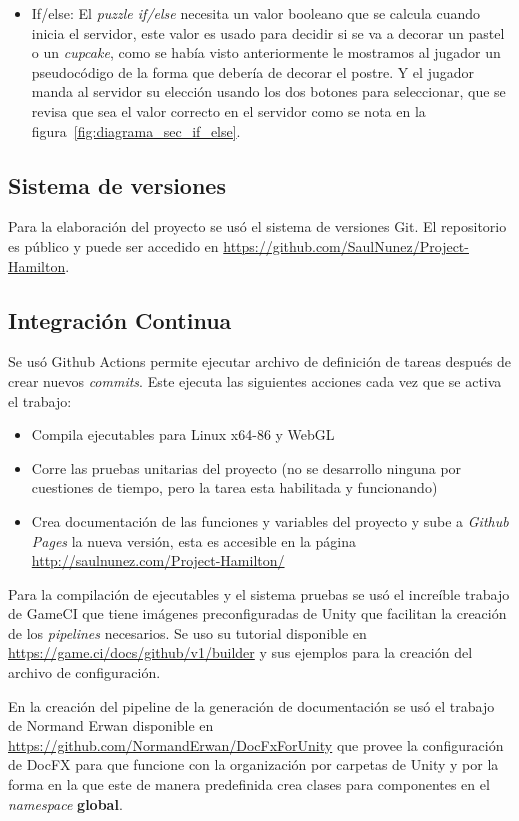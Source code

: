 \begin{itemize}
    \item If/else: El \textit{puzzle if/else} necesita un valor booleano que se calcula cuando inicia el servidor, este valor es usado para decidir si se va a decorar un pastel o un \textit{cupcake}, como se había visto anteriormente le mostramos al jugador un pseudocódigo de la forma que debería de decorar el postre. Y el jugador manda al servidor su elección usando los dos botones para seleccionar, que se revisa que sea el valor correcto en el servidor como se nota en la figura~\ref{fig:diagrama_sec_if_else}.
\end{itemize}


\subsection{Sistema de versiones}
Para la elaboración del proyecto se usó el sistema de versiones Git. El repositorio es público y puede ser accedido en \url{https://github.com/SaulNunez/Project-Hamilton}.

\subsection{Integración Continua}
Se usó Github Actions permite ejecutar archivo de definición de tareas después de crear nuevos \textit{commits}.
Este ejecuta las siguientes acciones cada vez que se activa el trabajo:
\begin{itemize}
    \item Compila ejecutables para Linux x64-86 y WebGL
    \item Corre las pruebas unitarias del proyecto (no se desarrollo ninguna por cuestiones de tiempo, pero la tarea esta habilitada y funcionando) 
    \item Crea documentación de las funciones y variables del proyecto y sube a \textit{Github Pages} la nueva versión, esta es accesible en la página  \url{http://saulnunez.com/Project-Hamilton/}
\end{itemize}

Para la compilación de ejecutables y el sistema pruebas se usó el increíble trabajo de GameCI que tiene imágenes preconfiguradas de Unity que facilitan la creación de los \textit{pipelines} necesarios. Se uso su tutorial disponible en \url{https://game.ci/docs/github/v1/builder} y sus ejemplos para la creación del archivo de configuración.

En la creación del pipeline de la generación de documentación se usó el trabajo de Normand Erwan disponible en \url{https://github.com/NormandErwan/DocFxForUnity} que provee la configuración de DocFX para que funcione con la organización por carpetas de Unity y por la forma en la que este de manera predefinida crea clases para componentes en el \textit{namespace} \textbf{global}.

